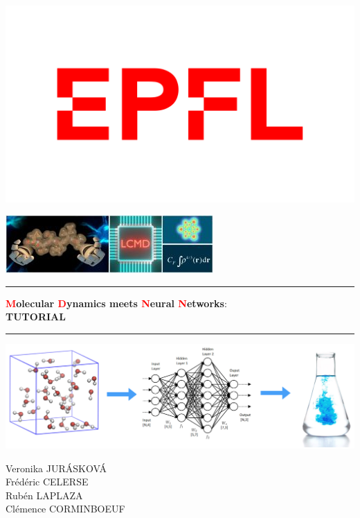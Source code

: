 \documentclass[12pt]{article}
\newcommand\Warning{%
 \makebox[1.4em][c]{%
 \makebox[0pt][c]{\raisebox{.1em}{\small!}}%
 \makebox[0pt][c]{\color{red}\Large$\bigtriangleup$}}}%
\begin{document}
\begin{minipage}[c]{0.5\linewidth}
\includegraphics[scale=0.2]{latex_files/EPFL-logo.png}
\end{minipage}
\begin{minipage}[c]{0.5\linewidth}
\includegraphics[scale=0.75]{latex_files/lcmd-logo.jpg}
\end{minipage}
\vspace{0.5cm}
\hrule 
\vspace{0.5cm}
\begin{center}
\LARGE \textbf{\textcolor{red}{M}olecular \textcolor{red}{D}ynamics meets \textcolor{red}{N}eural \textcolor{red}{N}etworks}: \\
\LARGE \textbf{TUTORIAL}
\vspace{0.5cm}
\\ %
\end{center}
\hrule 
\vspace{2cm}
\begin{center}
\includegraphics[scale=0.17]{latex_files/Picture.jpeg}
\end{center}
\vspace{1cm}
\begin{center}
    Veronika JURÁSKOVÁ \\
    Frédéric CELERSE \\
    Rubén LAPLAZA \\
    Clémence CORMINBOEUF
\end{center}
 
\end{document}
